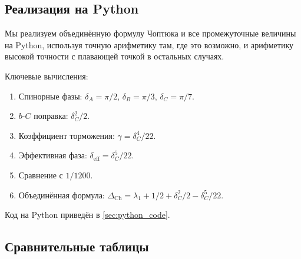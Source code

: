 \documentclass[12pt,a4paper]{article}
\theoremstyle{definition}
\theoremstyle{remark}
\begin{document}
\subsection{Реализация на Python}

Мы реализуем объединённую формулу Чоптюка и все промежуточные величины на Python, используя точную арифметику там, где это возможно, и арифметику высокой точности с плавающей точкой в остальных случаях.

Ключевые вычисления:
\begin{enumerate}
\item Спинорные фазы: $\delta_A = \pi/2$, $\delta_B = \pi/3$, $\delta_C = \pi/7$.
\item $b$-$C$ поправка: $\delta_C^2/2$.
\item Коэффициент торможения: $\gamma = \delta_C^4/22$.
\item Эффективная фаза: $\delta_{\mathrm{eff}} = \delta_C^5/22$.
\item Сравнение с $1/1200$.
\item Объединённая формула: $\Delta_{\mathrm{Ch}} = \lambda_1 + 1/2 + \delta_C^2/2 - \delta_C^5/22$.
\end{enumerate}

Код на Python приведён в \cref{sec:python_code}.

\subsection{Сравнительные таблицы}
\end{document}
